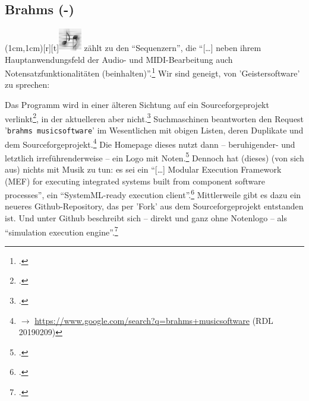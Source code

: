 %
%
%



\subsection{Brahms (-)}

\parpic(1cm,1cm)[r][t]{\includegraphics[width=1cm]{logos/brahms-300dpi.png}}
\label{Brahms} zählt  zu den \enquote{Sequenzern},
die \enquote{[\ldots] neben ihrem Hauptanwendungsfeld der Audio- und
MIDI-Bearbeitung auch Notensatzfunktionalitäten
(beinhalten)}.\footcite[vgl.][\nopage wp]{WpedNotensatz2019a} Wir sind geneigt,
von 'Geistersoftware' zu sprechen:

Das Programm  wird in einer älteren Sichtung auf ein
Sourceforgeprojekt verlinkt\footcite[vgl.][\nopage wp]{Callon2009a}, in der
aktuelleren aber nicht.\footcite[vgl.][\nopage wp]{WpedNotensatz2019a}
Suchmaschinen beantworten den Request '\texttt{brahms musicsoftware}' im
Wesentlichen mit obigen Listen, deren Duplikate und dem
Sourceforgeprojekt.\footnote{$\rightarrow$
\href{https://www.google.com/search?q=brahms+musicsoftware}
{https://www.google.com/search?q=brahms+musicsoftware} (RDL 20190209)} Die
Homepage dieses  nutzt dann -- beruhigender-
und letztlich irreführenderweise -- ein Logo mit Noten.\footcite[vgl.][\nopage
wp]{Brahms2013a} Dennoch hat (dieses)  (von sich aus) nichts mit
Musik zu tun: es sei ein \enquote{[\ldots] Modular Execution Framework (MEF) for
executing integrated systems built from component software processes}, ein
\enquote{SystemML-ready execution client}.\footcite[vgl.][\nopage
wp]{Brahms2013b} Mittlerweile gibt es dazu ein neueres Github-Repository, das
per 'Fork' aus dem Sourceforgeprojekt entstanden ist. Und unter Github
beschreibt sich  -- direkt und ganz ohne Notenlogo -- als
\enquote{simulation execution engine}.\footcite[vgl.][\nopage wp]{Brahms2018a}

